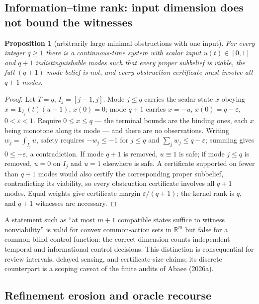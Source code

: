 \documentclass[10pt,twocolumn]{article}
\theoremstyle{plain}
\newtheorem{proposition}[theorem]{Proposition}
\theoremstyle{definition}
\theoremstyle{remark}
\begin{document}
\subsection{Information--time rank: input dimension does not bound the witnesses}\label{rank}

\begin{proposition}[arbitrarily large minimal obstructions with one input]\label{prop:rank}
For every integer \(q \ge 1\) there is a continuous-time system with scalar
input \(u(t) \in [0,1]\) and \(q+1\) indistinguishable modes such that every
proper subbelief is viable, the full \((q{+}1)\)-mode belief is not, and
every obstruction certificate must involve all \(q+1\) modes.
\end{proposition}

\begin{proof}
Let \(T = q\), \(I_j = [j-1, j]\). Mode \(j \le q\) carries the scalar state \(x\) obeying
\(\dot x = \mathbf{1}_{I_j}(t)(u - 1)\), \(x(0) = 0\); mode \(q+1\)
carries \(\dot x = -u\), \(x(0) = q - \varepsilon\), \(0 < \varepsilon
< 1\). Require \(0 \le x \le q\) --- the terminal bounds are the binding
ones, each \(x\) being monotone along its mode --- and there are no
observations. Writing
\(w_j = \int_{I_j} u\), safety requires \(-w_j \le -1\) for \(j \le q\) and
\(\sum_j w_j \le q - \varepsilon\); summing gives \(0 \le -\varepsilon\), a
contradiction. If mode \(q+1\) is removed, \(u \equiv 1\) is safe; if mode
\(j \le q\) is removed, \(u = 0\) on \(I_j\) and \(u = 1\) elsewhere is
safe. A certificate supported on fewer than \(q+1\) modes would also
certify the corresponding proper subbelief, contradicting its viability, so
every obstruction certificate involves all \(q+1\) modes. Equal weights give certificate margin \(\varepsilon/(q+1)\); the
kernel rank is \(q\), and \(q+1\) witnesses are necessary.
\end{proof}

A statement such as ``at most \(m+1\) compatible states suffice to witness
nonviability'' is valid for convex common-action sets in \(\mathbb{R}^m\) but
false for a common blind control function: the correct dimension counts
independent temporal and informational control decisions. This distinction
is consequential for review intervals, delayed sensing, and
certificate-size claims; its discrete counterpart is a scoping caveat of the
finite audits of Abaee (2026a).

\subsection{Refinement erosion and oracle recourse}\label{erosion}
\end{document}
